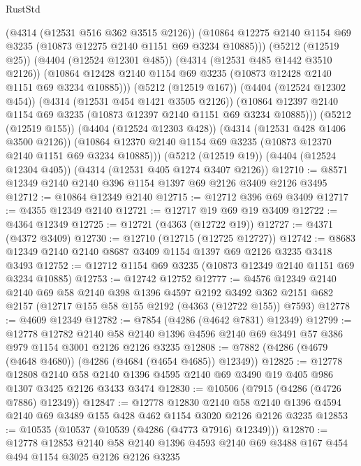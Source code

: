 \begin{lexlean}{RustStd}
\begin{coremodule}
{\begin{coremodule}
{{{{{{{{{{{{{{{{            (@4314 (@12531 @516 @362 @3515 @2126))
            (@10864 @12275 @2140 @1154 @69 @3235 (@10873 @12275 @2140 @1151 @69 @3234 @10885)))
          (@5212 (@12519 @25))
          (@4404 (@12524 @12301 @485))
          (@4314 (@12531 @485 @1442 @3510 @2126))
          (@10864 @12428 @2140 @1154 @69 @3235 (@10873 @12428 @2140 @1151 @69 @3234 @10885)))
        (@5212 (@12519 @167))
        (@4404 (@12524 @12302 @454))
        (@4314 (@12531 @454 @1421 @3505 @2126))
        (@10864 @12397 @2140 @1154 @69 @3235 (@10873 @12397 @2140 @1151 @69 @3234 @10885)))
      (@5212 (@12519 @155))
      (@4404 (@12524 @12303 @428))
      (@4314 (@12531 @428 @1406 @3500 @2126))
      (@10864 @12370 @2140 @1154 @69 @3235 (@10873 @12370 @2140 @1151 @69 @3234 @10885)))
    (@5212 (@12519 @19))
    (@4404 (@12524 @12304 @405))
    (@4314 (@12531 @405 @1274 @3407 @2126))
@12710 := @8571 @12349 @2140 @2140 @396 @1154 @1397 @69 @2126 @3409 @2126 @3495
@12712 := @10864 @12349 @2140
@12715 := @12712 @396 @69 @3409
@12717 := @4355 @12349 @2140
@12721 := @12717 @19 @69 @19 @3409
@12722 := @4364 @12349
@12725 := @12721 (@4363 (@12722 @19))
@12727 := @4371 (@4372 @3409)
@12730 := @12710 (@12715 (@12725 @12727))
@12742 := @8683 @12349 @2140 @2140 @8687 @3409 @1154 @1397 @69 @2126 @3235 @3418 @3493
@12752 := @12712 @1154 @69 @3235 (@10873 @12349 @2140 @1151 @69 @3234 @10885)
@12753 := @12742 @12752
@12777 := @4576
    @12349
    @2140
    @2140
    @69
    @58
    @2140
    @398
    @1396
    @4597
    @2192
    @3492
    @362
    @2151
    @682
    @2157
    (@12717 @155 @58 @155 @2192 (@4363 (@12722 @155)) @7593)
@12778 := @4609 @12349
@12782 := @7854 (@4286 (@4642 @7831) @12349)
@12799 := @12778
    @12782
    @2140
    @58
    @2140
    @1396
    @4596
    @2140
    @69
    @3491
    @57
    @386
    @979
    @1154
    @3001
    @2126
    @2126
    @3235
@12808 := @7882 (@4286 (@4679 (@4648 @4680)) (@4286 (@4684 (@4654 @4685)) @12349))
@12825 := @12778
    @12808
    @2140
    @58
    @2140
    @1396
    @4595
    @2140
    @69
    @3490
    @19
    @405
    @986
    @1307
    @3425
    @2126
    @3433
    @3474
@12830 := @10506 (@7915 (@4286 (@4726 @7886) @12349))
@12847 := @12778
    @12830
    @2140
    @58
    @2140
    @1396
    @4594
    @2140
    @69
    @3489
    @155
    @428
    @462
    @1154
    @3020
    @2126
    @2126
    @3235
@12853 := @10535 (@10537 (@10539 (@4286 (@4773 @7916) @12349)))
@12870 := @12778
    @12853
    @2140
    @58
    @2140
    @1396
    @4593
    @2140
    @69
    @3488
    @167
    @454
    @494
    @1154
    @3025
    @2126
    @2126
    @3235
}}}}}}}}}}}}}}}}
\end{coremodule}}
\end{coremodule}
\end{lexlean}
